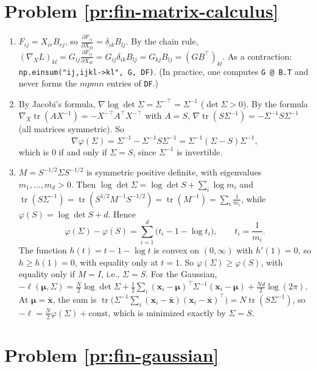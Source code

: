 \documentclass[11pt]{article}
\DeclareMathOperator{\tr}{tr}
\begin{document}
\section*{Problem \ref{pr:fin-matrix-calculus}}

\begin{enumerate}[label=(\alph*)]
    \item $F_{ij} = X_{ir}B_{rj}$, so $\frac{\partial F_{ij}}{\partial X_{kl}} = \delta_{ik}B_{lj}$. By the chain rule, $(\nabla_X L)_{kl} = G_{ij}\frac{\partial F_{ij}}{\partial X_{kl}} = G_{ij}\delta_{ik}B_{lj} = G_{kj}B_{lj} = (GB^\top)_{kl}$. As a contraction: \texttt{np.einsum("ij,ijkl->kl", G, DF)}. (In practice, one computes \texttt{G @ B.T} and never forms the $mpmn$ entries of \texttt{DF}.)
    \item By Jacobi's formula, $\nabla\log\det\Sigma = \Sigma^{-\top} = \Sigma^{-1}$ ($\det\Sigma > 0$). By the formula $\nabla_X\tr(AX^{-1}) = -X^{-\top}A^\top X^{-\top}$ with $A = S$, $\nabla\tr(S\Sigma^{-1}) = -\Sigma^{-1}S\Sigma^{-1}$ (all matrices symmetric). So
    \[\nabla\varphi(\Sigma) = \Sigma^{-1} - \Sigma^{-1}S\Sigma^{-1} = \Sigma^{-1}(\Sigma - S)\Sigma^{-1},\]
    which is $0$ if and only if $\Sigma = S$, since $\Sigma^{-1}$ is invertible.
    \item $M = S^{-1/2}\Sigma S^{-1/2}$ is symmetric positive definite, with eigenvalues $m_1, \ldots, m_d > 0$. Then $\log\det\Sigma = \log\det S + \sum_i\log m_i$ and $\tr(S\Sigma^{-1}) = \tr(S^{1/2}M^{-1}S^{-1/2}) = \tr(M^{-1}) = \sum_i\frac{1}{m_i}$, while $\varphi(S) = \log\det S + d$. Hence
    \[\varphi(\Sigma) - \varphi(S) = \sum_{i=1}^d\big(t_i - 1 - \log t_i\big), \qquad t_i = \frac{1}{m_i}.\]
    The function $h(t) = t - 1 - \log t$ is convex on $(0, \infty)$ with $h'(1) = 0$, so $h \geq h(1) = 0$, with equality only at $t = 1$. So $\varphi(\Sigma) \geq \varphi(S)$, with equality only if $M = I$, i.e., $\Sigma = S$.
    For the Gaussian, $-\ell(\boldsymbol{\mu}, \Sigma) = \frac{N}{2}\log\det\Sigma + \frac{1}{2}\sum_i(\mathbf{x}_i - \boldsymbol{\mu})^\top\Sigma^{-1}(\mathbf{x}_i - \boldsymbol{\mu}) + \frac{Nd}{2}\log(2\pi)$. At $\boldsymbol{\mu} = \bar{\mathbf{x}}$, the sum is $\tr\big(\Sigma^{-1}\sum_i(\mathbf{x}_i - \bar{\mathbf{x}})(\mathbf{x}_i - \bar{\mathbf{x}})^\top\big) = N\tr(S\Sigma^{-1})$, so $-\ell = \frac{N}{2}\varphi(\Sigma) + \text{const}$, which is minimized exactly by $\Sigma = S$.
\end{enumerate}

\section*{Problem \ref{pr:fin-gaussian}}
\end{document}
